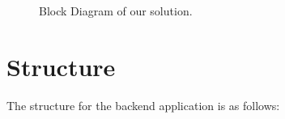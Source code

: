\begin{figure}[h]
	\begin{center}
	\end{center}
	\caption{Block Diagram of our solution.}\label{fig:backend_implementation}
\end{figure}

\newpage

\section{Structure}

The structure for the backend application is as follows:

